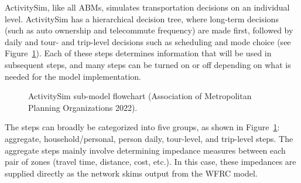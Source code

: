 \documentclass[fancy, twoside, mastersfancy, ms]{byuthesis}
\begin{document}
ActivitySim, like all ABMs, simulates transportation decisions on an
individual level. ActivitySim has a hierarchical decision tree, where
long-term decisions (such as auto ownership and telecommute frequency)
are made first, followed by daily and tour- and trip-level decisions
such as scheduling and mode choice (see
Figure~\ref{fig-asim-flowchart}). Each of these steps determines
information that will be used in subsequent steps, and many steps can be
turned on or off depending on what is needed for the model
implementation.

\begin{figure}


\caption[ActivitySim sub-model
flowchart.]{\label{fig-asim-flowchart}ActivitySim sub-model flowchart
(Association of Metropolitan Planning Organizations 2022).}

\end{figure}%

The steps can broadly be categorized into five groups, as shown in
Figure~\ref{fig-asim-flowchart}: aggregate, household/personal, person
daily, tour-level, and trip-level steps. The aggregate steps mainly
involve determining impedance measures between each pair of zones
(travel time, distance, cost, etc.). In this case, these impedances are
supplied directly as the network skims output from the WFRC model.
\end{document}
